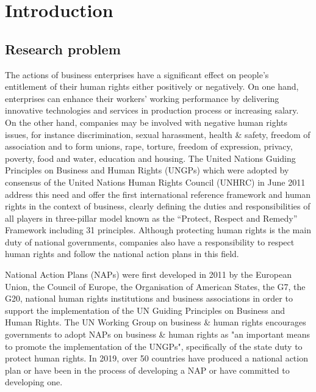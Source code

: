 \documentclass[draft=false
              ,paper=a4
              ,twoside=false
              ,fontsize=12pt
              ,headsepline
              ,BCOR10mm
              ,DIV11
              ]{scrbook}
\begin{document}
\frontmatter


\newpage


\tableofcontents
{}


\listoffigures
{}
\listoftables
{}

\newpage


\mainmatter
\chapter{Introduction}
\vspace{6pt}
\section{Research problem}
\vspace{6pt}
The actions of business enterprises have a significant effect on people’s entitlement of their human rights either positively or negatively. On one hand, enterprises can enhance their workers’ working performance by delivering innovative technologies and services in production process or increasing salary. On the other hand, companies may be involved with negative human rights issues, for instance discrimination, sexual harassment, health \& safety, freedom of association and to form unions, rape, torture, freedom of expression, privacy, poverty, food and water, education and housing. The United Nations Guiding Principles on Business and Human Rights (UNGPs)  which were adopted by consensus of the United Nations Human Rights Council (UNHRC) in June 2011 address this need and offer the first international reference framework and human rights in the context of business, clearly defining the duties and responsibilities of all players in three-pillar model known as the “Protect, Respect and Remedy” Framework including 31 principles. Although protecting human rights is the main duty of national governments, companies also have a responsibility to respect human rights and follow the national action plans in this field.

National Action Plans (NAPs) were first developed in 2011 by the European Union, the Council of Europe, the Organisation of American States, the G7, the G20, national human rights institutions and business associations in order to support the implementation of the UN Guiding Principles on Business and Human Rights. The UN Working Group on business \& human rights encourages governments to adopt NAPs on business \& human rights as "an important means to promote the implementation of the UNGPs", specifically of the state duty to protect human rights. In 2019, over 50 countries have produced a national action plan or have been in the process of developing a NAP or have committed to developing one.
\end{document}
